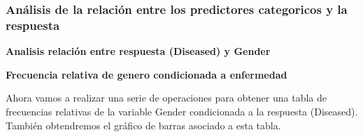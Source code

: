 \documentclass[
  11pt,
  a4paper,
]{article}
\begin{document}
\newpage

\hypertarget{anuxe1lisis-de-la-relaciuxf3n-entre-los-predictores-categoricos-y-la-respuesta}{%
\subsubsection{\texorpdfstring{Análisis de la relación entre los
predictores categoricos y la respuesta
}{Análisis de la relación entre los predictores categoricos y la respuesta }}\label{anuxe1lisis-de-la-relaciuxf3n-entre-los-predictores-categoricos-y-la-respuesta}}

\textbf{Analisis relación entre respuesta (Diseased) y Gender}

\vspace{0.55cm}

\textbf{Frecuencia relativa de genero condicionada a enfermedad}

Ahora vamos a realizar una serie de operaciones para obtener una tabla
de frecuencias relativas de la variable Gender condicionada a la
respuesta (Diseased). También obtendremos el gráfico de barras asociado
a esta tabla.
\end{document}
